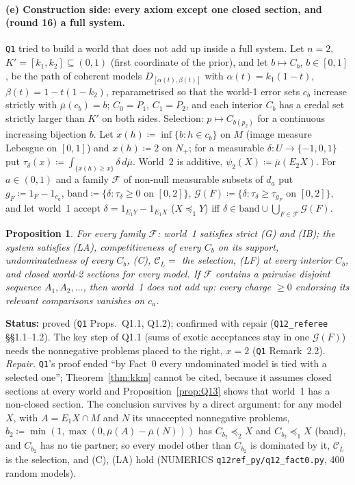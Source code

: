 \documentclass[11pt]{article}
\newtheorem{proposition}[theorem]{Proposition}
\theoremstyle{definition}
\theoremstyle{remark}
\newcommand{\C}{\mathcal C}
\newcommand{\src}[1]{\texttt{#1}}
\newcommand{\status}[1]{\par\smallskip\noindent\textbf{Status:} #1\par\smallskip}
\begin{document}
\paragraph{(e) Construction side: every axiom except one closed section, and (round 16) a full system.} \src{Q1} tried to build a world that does not add up inside a full system. Let $n=2$, $K'=[k_1,k_2]\subseteq(0,1)$ (first coordinate of the prior), and let $b\mapsto C_b$, $b\in[0,1]$, be the path of coherent models $D_{[\alpha(t),\beta(t)]}$ with $\alpha(t)=k_1(1-t)$, $\beta(t)=1-t(1-k_2)$, reparametrised so that the world-1 error sets $c_b$ increase strictly with $\bar\mu(c_b)=b$; $C_0=P_1$, $C_1=P_2$, and each interior $C_b$ has a credal set strictly larger than $K'$ on both sides. Selection: $p\mapsto C_{b(p_2)}$ for a continuous increasing bijection $b$. Let $x(h)\coloneqq\inf\{b:h\in c_b\}$ on $M$ (image measure Lebesgue on $[0,1]$) and $x(h)\coloneqq2$ on $N_+$; for a measurable $\delta:U\to\{-1,0,1\}$ put $\tau_\delta(x)\coloneqq\int_{\{x(h)\ge x\}}\delta\,d\bar\mu$. World~2 is additive, $\psi_2(X)\coloneqq\bar\mu(E_2X)$. For $a\in(0,1)$ and a family $\mathcal F$ of non-null measurable subsets of $d_a$ put $g_F\coloneqq1_F-1_{c_a}$, $\mathrm{band}\coloneqq\{\delta:\tau_\delta\ge0\text{ on }[0,2]\}$, $\mathcal G(F)\coloneqq\{\delta:\tau_\delta\ge\tau_{g_F}\text{ on }[0,2]\}$, and let world~1 accept $\delta=1_{E_1Y}-1_{E_1X}$ ($X\preceq_1Y$) iff $\delta\in\mathrm{band}\cup\bigcup_{F\in\mathcal F}\mathcal G(F)$.

\begin{proposition}\label{prop:Q12}
For every family $\mathcal F$: world~1 satisfies strict (G) and (IB); the system satisfies (LA), competitiveness of every $C_b$ on its support, undominatedness of every $C_b$, (C), $\C_L=$ the selection, (LF) at every interior $C_b$, and closed world-2 sections for every model. If $\mathcal F$ contains a pairwise disjoint sequence $A_1,A_2,\dots$, then world~1 does not add up: every charge $\ge0$ endorsing its relevant comparisons vanishes on $c_a$.
\end{proposition}
\status{proved (\src{Q1} Props.~Q1.1, Q1.2); confirmed with repair (\src{Q12\_referee} \S\S1.1--1.2). The key step of Q1.1 (sums of exotic acceptances stay in one $\mathcal G(F)$) needs the nonnegative problems placed to the right, $x=2$ (\src{Q1} Remark~2.2). \emph{Repair.} \src{Q1}'s proof ended ``by Fact~0 every undominated model is tied with a selected one''; Theorem~\ref{thm:kkm} cannot be cited, because it assumes closed sections at every world and Proposition~\ref{prop:Q13} shows that world~1 has a non-closed section. The conclusion survives by a direct argument: for any model $X$, with $A=E_1X\cap M$ and $N$ its unaccepted nonnegative problems, $b_2\coloneqq\min(1,\max(0,\bar\mu(A)-\bar\mu(N)))$ has $C_{b_2}\preceq_2X$ and $C_{b_2}\preceq_1X$ (band), and $C_{b_2}$ has no tie partner; so every model other than $C_{b_2}$ is dominated by it, $\C_L$ is the selection, and (C), (LA) hold (NUMERICS \src{q12ref\_py/q12\_fact0.py}, 400 random models).}
\end{document}
